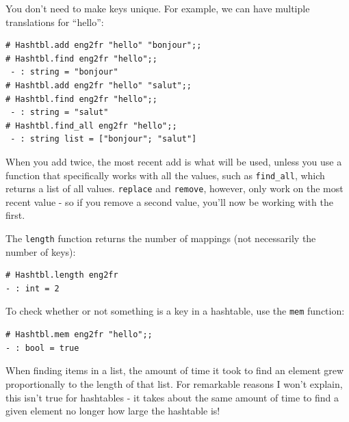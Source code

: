 \documentclass[10pt]{book}
\begin{document}
You don't need to make keys unique. For example, we can have
multiple translations for ``hello'':

\beforeverb
\begin{verbatim}
# Hashtbl.add eng2fr "hello" "bonjour";;
# Hashtbl.find eng2fr "hello";;
 - : string = "bonjour"
# Hashtbl.add eng2fr "hello" "salut";;
# Hashtbl.find eng2fr "hello";;
 - : string = "salut"
# Hashtbl.find_all eng2fr "hello";;
 - : string list = ["bonjour"; "salut"]
\end{verbatim}
\afterverb
When you add twice, the most recent add is what will be used, unless
you use a function that specifically works with all the values, such 
as {\tt \verb"find_all"}, which returns a list of all values. {\tt replace} 
and {\tt remove}, however, only work on the most recent value - so
if you remove a second value, you'll now be working with the first.

The {\tt length} function returns the number of mappings (not necessarily
the number of keys):

\beforeverb
\begin{verbatim}
# Hashtbl.length eng2fr
- : int = 2
\end{verbatim}
\afterverb

To check whether or not something is a key in a hashtable, use the {\tt mem}
function:

\beforeverb
\begin{verbatim}
# Hashtbl.mem eng2fr "hello";;
- : bool = true
\end{verbatim}
\afterverb


When finding items in a list, the amount of time it took to find an element
grew proportionally to the length of that list. For remarkable reasons I won't
explain, this isn't true for hashtables - it takes about the same amount of time
to find a given element no longer how large the hashtable is!

\end{document}
